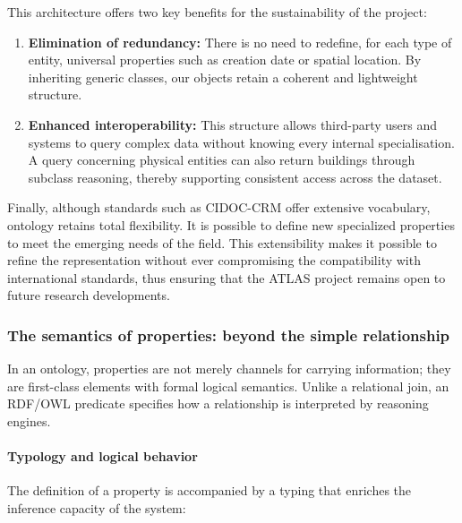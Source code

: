 \documentclass{article}
\begin{document}
This architecture offers two key benefits for the sustainability of the project:
\begin{enumerate}
\item \textbf{Elimination of redundancy:} There is no need to redefine, for each type of entity, universal properties such as creation date or spatial location. By inheriting generic classes, our objects retain a coherent and lightweight structure.
\item \textbf{Enhanced interoperability:} This structure allows third-party users and systems to query complex data without knowing every internal specialisation. A query concerning physical entities can also return buildings through subclass reasoning, thereby supporting consistent access across the dataset.
\end{enumerate}

Finally, although standards such as CIDOC-CRM offer extensive vocabulary, ontology retains total flexibility. It is possible to define new specialized properties to meet the emerging needs of the field. This extensibility makes it possible to refine the representation without ever compromising the compatibility with international standards, thus ensuring that the ATLAS project remains open to future research developments.
\subsubsection {The semantics of properties: beyond the simple relationship}

In an ontology, properties are not merely channels for carrying information; they are first-class elements with formal logical semantics. Unlike a relational join, an RDF/OWL predicate specifies how a relationship is interpreted by reasoning engines.

\paragraph{Typology and logical behavior }
The definition of a property is accompanied by a typing that enriches the inference capacity of the system:
\end{document}
